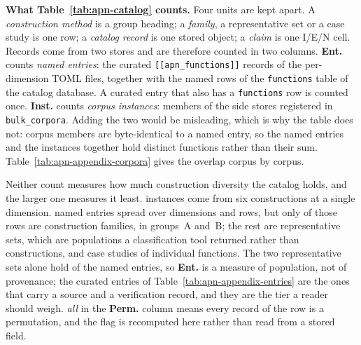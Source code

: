 \begin{sloppypar}
\noindent\textbf{What Table~\ref{tab:apn-catalog} counts.}
Four units are kept apart.  A \emph{construction method} is a group heading; a
\emph{family}, a representative set or a case study is one row; a \emph{catalog
record} is one stored object; a \emph{claim} is one I/E/N cell.  Records come from two stores and
are therefore counted in two columns.  \textbf{Ent.} counts \emph{named
entries}: the \apnCurated{} curated \texttt{[[apn\_functions]]} records of the
\apnCuratedFiles{} per-dimension TOML files, together with the named rows of the
\texttt{functions} table of the catalog database.  A curated entry that also has
a \texttt{functions} row is counted once.  \textbf{Inst.} counts \emph{corpus
instances}: members of the \apnCorpora{} side stores registered in
\texttt{bulk\_corpora}.  Adding the two would be misleading, which is why the
table does not: \apnStoreOverlap{} corpus members are byte-identical to a named
entry, so the \apnNamed{} named entries and the \apnInstances{} instances
together hold \apnDistinct{} distinct functions rather than their sum.
Table~\ref{tab:apn-appendix-corpora} gives the overlap corpus by corpus.

Neither count measures how much construction diversity the catalog holds, and
the larger one measures it least.  \apnInstances{} instances come from six
constructions at a single dimension.  \apnNamed{} named entries spread over
\apnNDims{} dimensions and \apnFamilies{} rows, but only \apnConstrFamilies{}
of those rows are construction families, in groups~A and~B; the rest are
\apnRepSets{} representative sets, which are populations a classification tool
returned rather than constructions, and \apnCaseStudies{} case studies of
individual functions.  The two representative sets alone hold \apnRepEntries{}
of the \apnNamed{} named entries, so \textbf{Ent.} is a measure of population,
not of provenance; the \apnCurated{} curated entries of
Table~\ref{tab:apn-appendix-entries} are the ones that carry a source and a
verification record, and they are the tier a reader should weigh.  \emph{all}
in the \textbf{Perm.} column means every record of the row is a permutation,
and the flag is recomputed here rather than read from a stored field.
\end{sloppypar}


